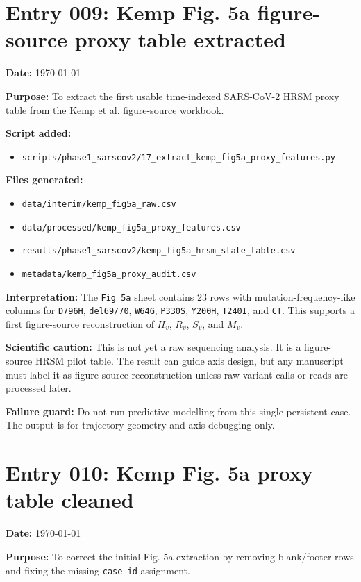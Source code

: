 \section*{Entry 009: Kemp Fig. 5a figure-source proxy table extracted}

\textbf{Date:} \today

\textbf{Purpose:} To extract the first usable time-indexed SARS-CoV-2 HRSM proxy table from the Kemp et al. figure-source workbook.

\textbf{Script added:}
\begin{itemize}
    \item \texttt{scripts/phase1\_sarscov2/17\_extract\_kemp\_fig5a\_proxy\_features.py}
\end{itemize}

\textbf{Files generated:}
\begin{itemize}
    \item \texttt{data/interim/kemp\_fig5a\_raw.csv}
    \item \texttt{data/processed/kemp\_fig5a\_proxy\_features.csv}
    \item \texttt{results/phase1\_sarscov2/kemp\_fig5a\_hrsm\_state\_table.csv}
    \item \texttt{metadata/kemp\_fig5a\_proxy\_audit.csv}
\end{itemize}

\textbf{Interpretation:} The \texttt{Fig 5a} sheet contains 23 rows with mutation-frequency-like columns for \texttt{D796H}, \texttt{del69/70}, \texttt{W64G}, \texttt{P330S}, \texttt{Y200H}, \texttt{T240I}, and \texttt{CT}. This supports a first figure-source reconstruction of \(H_v\), \(R_v\), \(S_v\), and \(M_v\).

\textbf{Scientific caution:} This is not yet a raw sequencing analysis. It is a figure-source HRSM pilot table. The result can guide axis design, but any manuscript must label it as figure-source reconstruction unless raw variant calls or reads are processed later.

\textbf{Failure guard:} Do not run predictive modelling from this single persistent case. The output is for trajectory geometry and axis debugging only.


\section*{Entry 010: Kemp Fig. 5a proxy table cleaned}

\textbf{Date:} \today

\textbf{Purpose:} To correct the initial Fig. 5a extraction by removing blank/footer rows and fixing the missing \texttt{case\_id} assignment.

